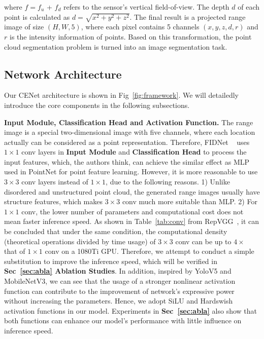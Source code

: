 \documentclass{article}
\begin{document}
where $f = f_{u}$ + $f_{d}$ refers to the sensor's vertical field-of-view. The depth $d$ of each point is calculated as $d = \sqrt{x^{2} + y^{2} + z^{2}}$.
The final result is a projected range image of size $(H, W, 5)$, where each pixel contains 5 channels $(x, y, z, d, r)$ and $r$ is the intensity information of points. Based on this transformation, the point cloud segmentation problem is turned into an image segmentation task.

\subsection{Network Architecture}
\label{sec:network arch}
Our CENet architecture is shown in Fig~\ref{fig:framework}. We will detailedly introduce the core components in the following subsections.

\noindent\textbf{Input Module, Classification Head and Activation Function.} The range image is a special two-dimensional image with five channels, where each location actually can be considered as a point representation. Therefore, FIDNet ~\cite{zhao2021fidnet} uses $1 \times 1$ conv layers in \textbf{Input Module} and \textbf{Classification Head} to process the input features, which, the authors think, can achieve the similar effect as MLP used in PointNet for point feature learning. However, it is more reasonable to use $3\times3$ conv layers instead of $1\times1$, due to the following reasons. 1) Unlike disordered and unstructured point cloud, the generated range images usually have structure features, which makes $3\times3$ conv much more suitable than MLP. 2) For $1\times1$ conv, the lower number of parameters and computational cost does not mean faster inference speed. As shown in Table~\ref{tab:conv} from RepVGG~\cite{ding2021repvgg}, it can be concluded that under the same condition, the computational density (theoretical operations divided by time usage) of $3\times3$ conv can be up to $4\times$ that of $1\times1$ conv on a 1080Ti GPU. Therefore, we attempt to conduct a simple substitution to improve the inference speed, which will be verified in \textbf{ Sec~\ref{sec:abla} Ablation Studies}. In addition, inspired by YoloV5 and MobileNetV3, we can see that the usage of a stronger nonlinear activation function can contribute to the improvement of network's expressive power without increasing the parameters. Hence, we adopt SiLU and Hardswish activation functions in our model. Experiments in \textbf{Sec~\ref{sec:abla}} also show that both functions can enhance our model's performance with little influence on inference speed.
\end{document}
